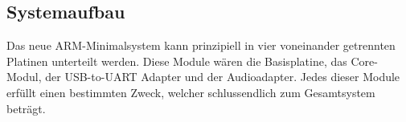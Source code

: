 

\subsection{Systemaufbau}
\label{sec:systemaufbau}

Das neue \gls{ARM}-\gls{Minimalsystem} kann prinzipiell in vier voneinander getrennten Platinen unterteilt werden. Diese Module wären die \gls{Basisplatine}, das \gls{Core-Modul}, der \gls{USB-to-UART} Adapter und der Audioadapter. Jedes dieser Module erfüllt einen bestimmten Zweck, welcher schlussendlich zum Gesamtsystem beträgt.

